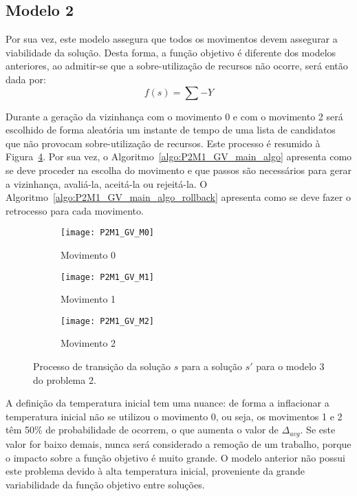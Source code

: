 \subsection{Modelo 2}

Por sua vez, este modelo assegura que todos os movimentos devem assegurar a viabilidade da solução. Desta forma, a função objetivo é diferente dos modelos anteriores, ao admitir-se que a sobre-utilização de recursos não ocorre, será então dada por:
$$f(s) = \sum -Y$$

Durante a geração da vizinhança com o movimento 0 e com o movimento 2 será escolhido de forma aleatória um instante de tempo de uma lista de candidatos que não provocam sobre-utilização de recursos. Este processo é resumido à Figura~\ref{fig:P2M1_GV_gen}. Por sua vez, o Algoritmo~\ref{algo:P2M1_GV_main_algo} apresenta como se deve proceder na escolha do movimento e que passos são necessários para gerar a vizinhança, avaliá-la, aceitá-la ou rejeitá-la. O Algoritmo~\ref{algo:P2M1_GV_main_algo_rollback} apresenta como se deve fazer o retrocesso para cada movimento.\\
\begin{figure}[H]
	\centering
	\begin{subfigure}{0.49\textwidth}
	\centering
		\texttt{[image: P2M1\_GV\_M0]}
		\caption{Movimento 0}
		\label{fig:P2M1_GV_M0}
	\end{subfigure}
	\begin{subfigure}{0.49\textwidth}
	\centering
		\texttt{[image: P2M1\_GV\_M1]}
		\caption{Movimento 1}
		\label{fig:P2M1_GV_M1}
	\end{subfigure}
	\begin{subfigure}{0.49\textwidth}
	\centering
		\texttt{[image: P2M1\_GV\_M2]}
		\caption{Movimento 2}
		\label{fig:P2M1_GV_M2}
	\end{subfigure}
	\caption{Processo de transição da solução $s$ para a solução $s'$ para o modelo 3 do problema 2.}
	\label{fig:P2M1_GV_gen}
\end{figure}

A definição da temperatura inicial tem uma nuance: de forma a inflacionar a temperatura inicial não se utilizou o movimento 0, ou seja, os movimentos 1 e 2 têm 50\% de  probabilidade de ocorrem, o que aumenta o valor de $\Delta_{avg}$. Se este valor for baixo demais, nunca será considerado a remoção de um trabalho, porque o impacto sobre a função objetivo é muito grande. O modelo anterior não possui este problema devido à alta temperatura inicial, proveniente da grande variabilidade da função objetivo entre soluções.\\

